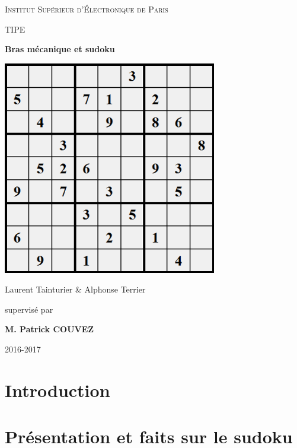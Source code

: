 \documentclass[12pt,a4paper]{report}
\newenvironment{changemargin}[2]{\begin{list}{}{%
\setlength{\topsep}{0pt}%
\setlength{\leftmargin}{0pt}%
\setlength{\rightmargin}{0pt}%
\setlength{\listparindent}{\parindent}%
\setlength{\itemindent}{\parindent}%
\setlength{\parsep}{0pt plus 1pt}%
\addtolength{\leftmargin}{#1}%
\addtolength{\rightmargin}{#2}%
}\item }{\end{list}}
\begin{document}
\FloatBarrier

\begin{titlepage}
\begin{changemargin}{-1cm}{0cm}
	\centering
	\vspace{5cm}
	{\scshape\huge Institut Supérieur d'Électronique de Paris \par}
	\vspace{1cm}
	{\scshape\LARGE TIPE\par}
	\vspace{1.5cm}
	{\fontsize{45}{45}\selectfont\bfseries Bras mécanique et sudoku\par}
	\vspace{2cm}
	\includegraphics[width=0.7\textwidth]{../pictures/pagedegarde.png}\par\vspace{1.5cm}
	{\LARGE Laurent Tainturier \& Alphonse Terrier\par}
	\vfill
	\large supervisé par\par
	\large \bfseries M. Patrick COUVEZ

	\vfill

	{\large 2016-2017}
\end{changemargin}
\end{titlepage}

\tableofcontents
{}
	\chapter*{Introduction}
	

	\chapter{Présentation et faits sur le sudoku}
	
\end{document}
